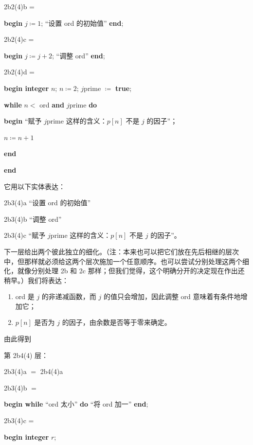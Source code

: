 \noindent
2b2(4)b =

\noindent
\textbf{begin} $j \coloneq 1$; “设置 ord 的初始值” \textbf{end};

\noindent
2b2(4)c =

\noindent
\textbf{begin} $j \coloneq j + 2$; “调整 ord” \textbf{end};

\noindent
2b2(4)d =

\noindent
\textbf{begin integer} $n$; $n \coloneq 2$; $j$prime $\coloneq$ \textbf{true};

\noindent
\quad\textbf{while} $n <$ ord \textbf{and} $j$prime \textbf{do}

\noindent
\quad\quad\textbf{begin} “赋予 $j$prime 这样的含义：$p[n]$ 不是 $j$ 的因子”；

\noindent
\quad\quad\quad $n \coloneq n + 1$

\noindent
\quad\textbf{end}

\noindent
\textbf{end}

\noindent
它用以下实体表达：

\noindent
2b3(4)a\tabto{5em} “设置 ord 的初始值”

\noindent
2b3(4)b\tabto{5em} “调整 ord”

\noindent
2b3(4)c\tabto{5em} “赋予 $j$prime 这样的含义：$p[n]$ 不是 $j$ 的因子”。

下一层给出两个彼此独立的细化。（注：本来也可以把它们放在先后相继的层次中，但那样就必须给这两个层次施加一个任意顺序。也可以尝试分别处理这两个细化，就像分别处理 2b 和 2c 那样；但我们觉得，这个明确分开的决定现在作出还稍早。）我们将表达：

\begin{enumerate}[leftmargin=2\parindent, label=(\arabic*)]
	\item ord 是 $j$ 的非递减函数，而 $j$ 的值只会增加，因此调整 ord 意味着有条件地增加它；

	\item $p[n]$ 是否为 $j$ 的因子，由余数是否等于零来确定。
\end{enumerate}

\noindent
由此得到

\noindent
第 2b4(4) 层：

\noindent
2b3(4)a $=$ 2b4(4)a

\noindent
2b3(4)b $=$

\noindent
\textbf{begin while} “ord 太小” \textbf{do} “将 ord 加一” \textbf{end};

\noindent
2b3(4)c =

\noindent
\textbf{begin integer} $r$;

